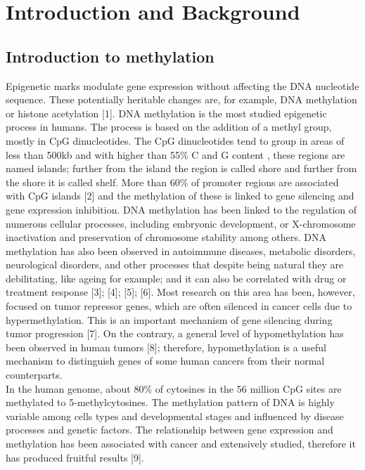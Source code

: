 \documentclass[10pt,letterpaper]{article}
\begin{document}

\linenumbers

\hypertarget{introduction-and-background}{%
\section{Introduction and
Background}\label{introduction-and-background}}

\hypertarget{introduction-to-methylation}{%
\subsection{Introduction to
methylation}\label{introduction-to-methylation}}

Epigenetic marks modulate gene expression without affecting the DNA
nucleotide sequence. These potentially heritable changes are, for
example, DNA methylation or histone acetylation {[}1{]}. DNA
methylation is the most studied epigenetic process in humans. The
process is based on the addition of a methyl group, mostly in CpG
dinucleotides. The CpG dinucleotides tend to group in areas of less than
500kb and with higher than 55\% C and G content , these regions are
named islands; further from the island the region is called shore and
further from the shore it is called shelf. More than 60\% of promoter
regions are associated with CpG islands {[}2{]} and the methylation of
these is linked to gene silencing and gene expression inhibition. DNA
methylation has been linked to the regulation of numerous cellular
processes, including embryonic development, or X-chromosome inactivation
and preservation of chromosome stability among others. DNA methylation
has also been observed in autoimmune diseases, metabolic disorders,
neurological disorders, and other processes that despite being natural
they are debilitating, like ageing for example; and it can also be
correlated with drug or treatment response {[}3{]}; {[}4{]}; {[}5{]};
{[}6{]}. Most research on this area has been, however, focused on tumor
repressor genes, which are often silenced in cancer cells due to
hypermethylation. This is an important mechanism of gene silencing
during tumor progression {[}7{]}. On the contrary, a general level of
hypomethylation has been observed in human tumors {[}8{]}; therefore,
hypomethylation is a useful mechanism to distinguish genes of some human
cancers from their normal counterparts.\\
In the human genome, about 80\% of cytosines in the 56 million CpG sites
are methylated to 5-methylcytosines. The methylation pattern of DNA is
highly variable among cells types and developmental stages and
influenced by disease processes and genetic factors. The relationship
between gene expression and methylation has been associated with cancer
and extensively studied, therefore it has produced fruitful results
{[}9{]}.
\end{document}
